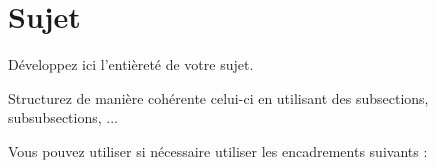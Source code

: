 \section{Sujet}
Développez ici l'entièreté de votre sujet.

Structurez de manière cohérente celui-ci en utilisant des subsections, subsubsections, ...


Vous pouvez utiliser si nécessaire utiliser les encadrements suivants :



